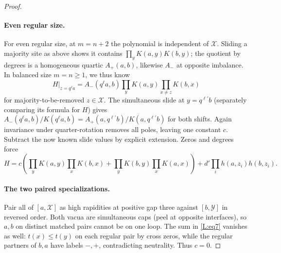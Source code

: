 \documentclass[11pt]{article}
\numberwithin{equation}{section}
\theoremstyle{definition}\newtheorem{definition}[theorem]{Definition}
\theoremstyle{remark}\newtheorem{remark}[theorem]{Remark}
\begin{document}
\begin{proof}
\paragraph{Even regular size.}
For even regular size, at \(m=n+2\) the polynomial is independent of \(\mathcal X\). Sliding a majority site as above shows it contains \(\prod_y K(a,y)K(b,y)\); the quotient by degrees is a homogeneous quartic \(A_+(a,b)\), likewise \(A_-\) at opposite imbalance. In balanced size \(m=n\ge1\), we thus know
\[
 H|_{z=q^\ell a}=A_-(q^\ell a,b)\prod_y K(a,y)\prod_{x\ne z}K(b,x)
\]
for majority-to-be-removed \(z\in\mathcal X\). The simultaneous slide at \(y=q^{\ell'}b\) (separately comparing its formula for \(H\)) gives \(A_-(q^\ell a,b)/K(q^\ell a,b)=A_+(a,q^{\ell'}b)/K(a,q^{\ell'}b)\) for both shifts. Again invariance under quarter-rotation removes all poles, leaving one constant \(c\). Subtract the now known slide values by explicit extension. Zeros and degrees force
\[
 H=c\left(\prod_y K(a,y)\prod_x K(b,x)+\prod_y K(b,y)\prod_x K(a,x)\right)
     +d'\prod_i h(a,z_i)h(b,z_i).
\]
\paragraph{The two paired specializations.}
Pair all of \([a,\mathcal X]\) as high rapidities at positive gap three against \([b,\mathcal Y]\) in reversed order. Both vacua are simultaneous caps (peel at opposite interfaces), so \(a,b\) on distinct matched pairs cannot be on one loop. The sum in \eqref{L:eq7} vanishes as well: \(t(x)\le t(y)\) on each regular pair by cross zeros, while the regular partners of \(b,a\) have labels \(-,+\), contradicting neutrality. Thus \(c=0\).


\end{proof}
\end{document}
